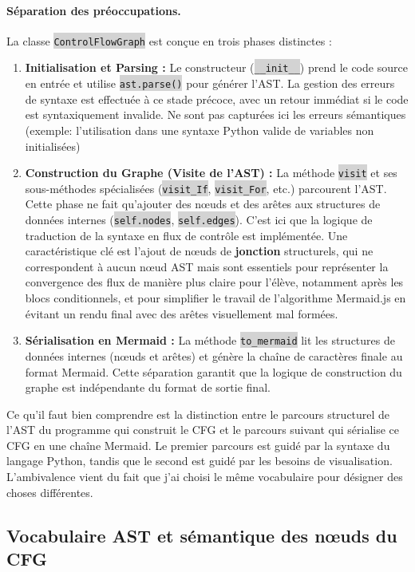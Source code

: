 \documentclass[11pt,a4paper]{article}
\newcommand{\code}[1]{\colorbox{lightgray}{\texttt{\small #1}}}
\begin{document}
\paragraph{Séparation des préoccupations.} La classe \code{ControlFlowGraph} est conçue en trois phases distinctes :
\begin{enumerate}
    \item \textbf{Initialisation et Parsing :} Le constructeur (\code{\_\_init\_\_}) prend le code source en entrée et utilise \code{ast.parse()} pour générer l'AST. La gestion des erreurs de syntaxe est effectuée à ce stade précoce, avec un retour immédiat si le code est syntaxiquement invalide. Ne sont pas capturées ici les erreurs sémantiques (exemple: l'utilisation dans une syntaxe Python valide de variables non initialisées)
    \item \textbf{Construction du Graphe (Visite de l'AST) :} La méthode \code{visit} et ses sous-méthodes spécialisées (\code{visit\_If}, \code{visit\_For}, etc.) parcourent l'AST. Cette phase ne fait qu'ajouter des nœuds et des arêtes aux structures de données internes (\code{self.nodes}, \code{self.edges}). C'est ici que la logique de traduction de la syntaxe en flux de contrôle est implémentée. Une caractéristique clé est l'ajout de nœuds de \textbf{jonction} structurels, qui ne correspondent à aucun nœud AST mais sont essentiels pour représenter la convergence des flux de manière plus claire pour l'élève, notamment après les blocs conditionnels, et pour simplifier le travail de l'algorithme Mermaid.js en évitant un rendu final avec des arêtes visuellement mal formées.
    \item \textbf{Sérialisation en Mermaid :} La méthode \code{to\_mermaid} lit les structures de données internes (nœuds et arêtes) et génère la chaîne de caractères finale au format Mermaid. Cette séparation garantit que la logique de construction du graphe est indépendante du format de sortie final.
\end{enumerate}
Ce qu'il faut bien comprendre est la distinction entre le parcours structurel de l'AST du programme qui construit le CFG et le parcours suivant qui sérialise ce CFG en une chaîne Mermaid. Le premier parcours est guidé par la syntaxe du langage Python, tandis que le second est guidé par les besoins de visualisation.
L'ambivalence vient du fait que j'ai choisi le même vocabulaire pour désigner des choses différentes.

\subsection{Vocabulaire AST et sémantique des nœuds du CFG}
\end{document}
